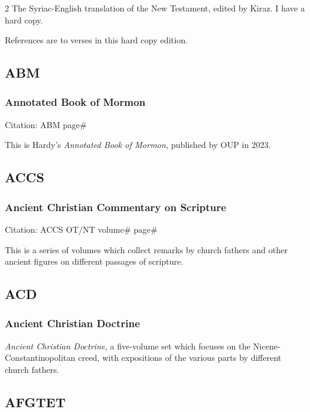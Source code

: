 \begin{multicols}{2}
			The Syriac-English translation of the New Testament, edited by Kiraz. I have a hard copy.
			
			References are to verses in this hard copy edition.
			
	\subsection*{ABM}
	
		\subsubsection*{Annotated Book of Mormon}
		
			Citation:
				ABM page\#
		
			This is Hardy's \textit{Annotated Book of Mormon}, published by OUP in 2023.
			
	\subsection*{ACCS}
	
		\subsubsection*{Ancient Christian Commentary on Scripture}
		
			Citation:
				ACCS OT/NT volume\# page\#
				
			This is a series of volumes which collect remarks by church fathers and other ancient figures on different passages of scripture.
			
	\subsection*{ACD}
	
		\subsubsection*{Ancient Christian Doctrine}
		
			\textit{Ancient Christian Doctrine}, a five-volume set which focuses on the Nicene-Constantinopolitan creed, with expositions of the various parts by different church fathers.
			
	\subsection*{AFGTET}
	

\end{multicols}
